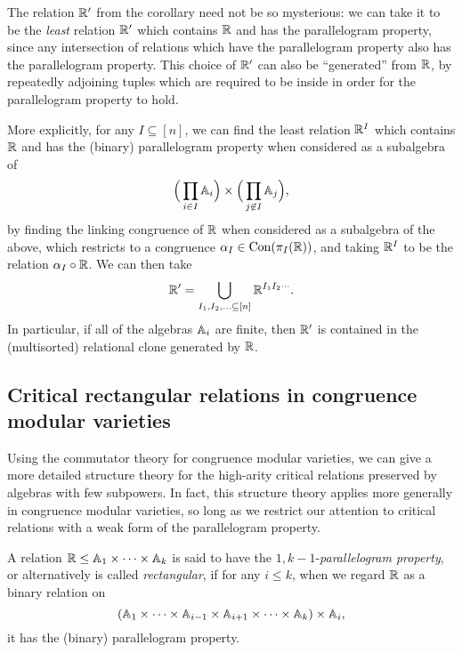 \documentclass[letterpaper,11pt]{article}
\DeclareMathOperator{\Con}{Con}
\begin{document}
The relation $\mathbb{R}'$ from the corollary need not be so mysterious: we can take it to be the \emph{least} relation $\mathbb{R}'$ which contains $\mathbb{R}$ and has the parallelogram property, since any intersection of relations which have the parallelogram property also has the parallelogram property. This choice of $\mathbb{R}'$ can also be ``generated'' from $\mathbb{R}$, by repeatedly adjoining tuples which are required to be inside in order for the parallelogram property to hold.

More explicitly, for any $I \subseteq [n]$, we can find the least relation $\mathbb{R}^I$ which contains $\mathbb{R}$ and has the (binary) parallelogram property when considered as a subalgebra of
\[
\Big(\prod_{i \in I} \mathbb{A}_i\Big) \times \Big(\prod_{j \not\in I} \mathbb{A}_{j}\Big),
\]
by finding the linking congruence of $\mathbb{R}$ when considered as a subalgebra of the above, which restricts to a congruence $\alpha_I \in \Con(\pi_I(\RR))$, and taking $\mathbb{R}^I$ to be the relation $\alpha_I \circ \mathbb{R}$. We can then take
\[
\mathbb{R}' = \bigcup_{I_1, I_2, ... \subseteq [n]} \mathbb{R}^{I_1I_2\cdots}.
\]
In particular, if all of the algebras $\mathbb{A}_i$ are finite, then $\mathbb{R}'$ is contained in the (multisorted) relational clone generated by $\mathbb{R}$.%


\subsection{Critical rectangular relations in congruence modular varieties}

Using the commutator theory for congruence modular varieties, we can give a more detailed structure theory for the high-arity critical relations preserved by algebras with few subpowers. In fact, this structure theory applies more generally in congruence modular varieties, so long as we restrict our attention to critical relations with a weak form of the parallelogram property.

\begin{defn} A relation $\mathbb{R} \le \mathbb{A}_1 \times \cdots \times \mathbb{A}_k$ is said to have the $1,k-1$-\emph{parallelogram property}, or alternatively is called \emph{rectangular}, if for any $i \le k$, when we regard $\mathbb{R}$ as a binary relation on
\[
(\mathbb{A}_1 \times \cdots \times \mathbb{A}_{i-1} \times \mathbb{A}_{i+1} \times \cdots \times \mathbb{A}_k) \times \mathbb{A}_i,
\]
it has the (binary) parallelogram property.
\end{defn}
\end{document}
